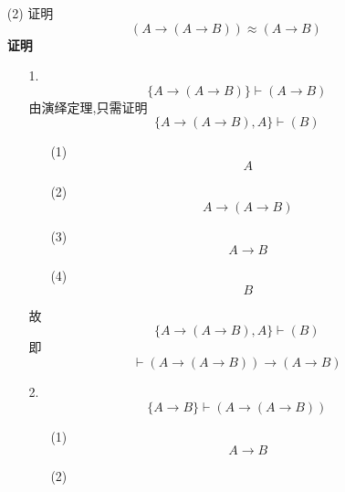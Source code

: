 \documentclass[11pt,oneside,a4paper]{article}
\begin{document}
\begin{itemize}
\begin{itemize}
            \item[(2)]   证明\[(A \to (A \to B)) \approx (A \to B)\]
            \textbf{证明}
            \begin{itemize}
                \item[1.]   \[\{ A \to (A \to B)\}  \vdash (A \to B)\]
                    由演绎定理,只需证明
                            \[\{ A \to (A \to B),A\}  \vdash (B)\]
                    \begin{enumerate}
                        \item[(1)]
                                \begin{equation*}
                                    A \tag*{$\varGamma$}
                                \end{equation*}
                        \item[(2)]
                                \begin{equation*}
                                    A \to (A \to B) \tag*{$\varGamma$}
                                \end{equation*}
                        \item[(3)]
                                \begin{equation*}
                                    A \to B \tag*{MP(1,2)}
                                \end{equation*}
                        \item[(4)]
                                \begin{equation*}
                                   B \tag*{MP(1,3)}
                                \end{equation*}
                    \end{enumerate}
                    故\[\{ A \to (A \to B),A\}  \vdash (B)\]
                    即\[ \vdash (A \to (A \to B)) \to (A \to B)\]
                \item[2.]   \[\{ A \to B \}  \vdash  (A \to (A \to B)) \]
                    \begin{enumerate}
                        \item[(1)]
                                \begin{equation*}
                                    A \to B                         \tag*{$\varGamma$}
                                \end{equation*}
                        \item[(2)]
                                \begin{equation*}

\end{equation*}
\end{enumerate}
\end{itemize}
\end{itemize}
\end{itemize}
\end{document}
